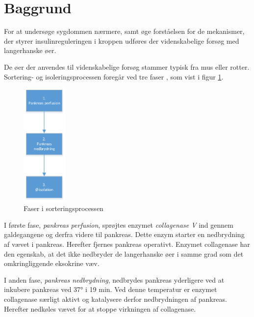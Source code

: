 \section{Baggrund}
For at undersøge sygdommen nærmere, samt øge forståelsen for de mekanismer, der styrer insulinreguleringen i kroppen udføres der videnskabelige forsøg med langerhanske øer.

De øer der anvendes til videnskabelige forsøg stammer typisk fra mus eller rotter. Sortering- og isoleringsprocessen foregår ved tre faser \citep{per}, som vist i figur \ref{fig:sortproces}. 

\begin{figure}[H]
	\centering
	\includegraphics[width=0.2\textwidth]{billeder/sortering-crop.pdf}
	\caption{Faser i sorteringsprocessen}
	\label{fig:sortproces}
\end{figure}

I første fase, \textit{pankreas perfusion}, sprøjtes enzymet \textit{collagenase V} ind gennem galdegangene og derfra videre til  pankreas. Dette enzym starter en nedbrydning af vævet i pankreas. Herefter fjernes pankreas operativt. Enzymet collagenase har den egenskab, at det ikke nedbryder de langerhanske øer i samme grad som det omkringliggende eksokrine væv.

I anden fase, \textit{pankreas nedbrydning}, nedbrydes pankreas yderligere ved at inkubere pankreas ved 37° i 19 min. Ved denne temperatur er enzymet collagenase særligt aktivt og katalysere derfor nedbrydningen af pankreas. Herefter nedkøles vævet for at stoppe virkningen af collagenase.


